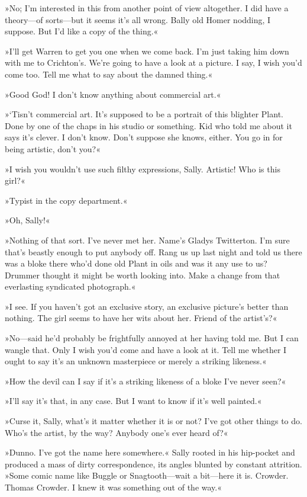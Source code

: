 »No; I'm interested in this from another point of view altogether. I did have a theory—of sorts—but it seems it's all wrong. Bally old Homer nodding, I suppose. But I'd like a copy of the thing.«

»I'll get Warren to get you one when we come back. I'm just taking him down with me to Crichton's. We're going to have a look at a picture. I say, I wish you'd come too. Tell me what to say about the damned thing.«

»Good God! I don't know anything about commercial art.«

»`Tisn't commercial art. It's supposed to be a portrait of this blighter Plant. Done by one of the chaps in his studio or something. Kid who told me about it says it's clever. I don't know. Don't suppose she knows, either. You go in for being artistic, don't you?«

»I wish you wouldn't use such filthy expressions, Sally. Artistic! Who is this girl?«

»Typist in the copy department.«

»Oh, Sally!«

»Nothing of that sort. I've never met her. Name's Gladys Twitterton. I'm sure that's beastly enough to put anybody off. Rang us up last night and told us there was a bloke there who'd done old Plant in oils and was it any use to us? Drummer thought it might be worth looking into. Make a change from that everlasting syndicated photograph.«

»I see. If you haven't got an exclusive story, an exclusive picture's better than nothing. The girl seems to have her wits about her. Friend of the artist's?«

»No—said he'd probably be frightfully annoyed at her having told me. But I can wangle that. Only I wish you'd come and have a look at it. Tell me whether I ought to say it's an unknown masterpiece or merely a striking likeness.«

»How the devil can I say if it's a striking likeness of a bloke I've never seen?«

»I'll say it's that, in any case. But I want to know if it's well painted.«

»Curse it, Sally, what's it matter whether it is or not? I've got other things to do. Who's the artist, by the way? Anybody one's ever heard of?«

»Dunno. I've got the name here somewhere.« Sally rooted in his hip-pocket and produced a mass of dirty correspondence, its angles blunted by constant attrition. »Some comic name like Buggle or Snagtooth—wait a bit—here it is. Crowder. Thomas Crowder. I knew it was something out of the way.«

